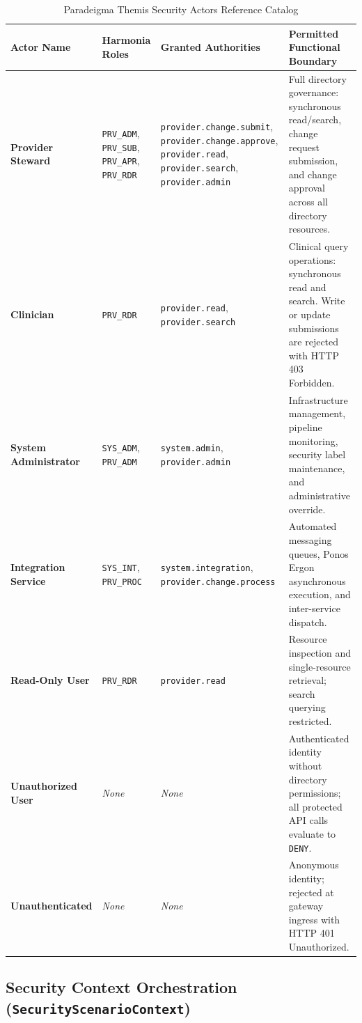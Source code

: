 \begin{table}[htbp]
\centering
\small
\begin{tabularx}{\textwidth}{l p{2.5cm} p{3.5cm} X}
\toprule
\textbf{Actor Name} & \textbf{Harmonia Roles} & \textbf{Granted Authorities} & \textbf{Permitted Functional Boundary} \\
\midrule
\textbf{Provider Steward} & \texttt{PRV\_ADM}, \texttt{PRV\_SUB}, \texttt{PRV\_APR}, \texttt{PRV\_RDR} & \texttt{provider.change.submit}, \texttt{provider.change.approve}, \texttt{provider.read}, \texttt{provider.search}, \texttt{provider.admin} & Full directory governance: synchronous read/search, change request submission, and change approval across all directory resources. \\
\addlinespace
\textbf{Clinician} & \texttt{PRV\_RDR} & \texttt{provider.read}, \texttt{provider.search} & Clinical query operations: synchronous read and search. Write or update submissions are rejected with HTTP 403 Forbidden. \\
\addlinespace
\textbf{System Administrator} & \texttt{SYS\_ADM}, \texttt{PRV\_ADM} & \texttt{system.admin}, \texttt{provider.admin} & Infrastructure management, pipeline monitoring, security label maintenance, and administrative override. \\
\addlinespace
\textbf{Integration Service} & \texttt{SYS\_INT}, \texttt{PRV\_PROC} & \texttt{system.integration}, \texttt{provider.change.process} & Automated messaging queues, Ponos Ergon asynchronous execution, and inter-service dispatch. \\
\addlinespace
\textbf{Read-Only User} & \texttt{PRV\_RDR} & \texttt{provider.read} & Resource inspection and single-resource retrieval; search querying restricted. \\
\addlinespace
\textbf{Unauthorized User} & \textit{None} & \textit{None} & Authenticated identity without directory permissions; all protected API calls evaluate to \texttt{DENY}. \\
\addlinespace
\textbf{Unauthenticated} & \textit{None} & \textit{None} & Anonymous identity; rejected at gateway ingress with HTTP 401 Unauthorized. \\
\bottomrule
\end{tabularx}
\caption{Paradeigma Themis Security Actors Reference Catalog}
\label{tab:paradeigma_security_actors}
\end{table}

\subsection{Security Context Orchestration (\texttt{SecurityScenarioContext})}

